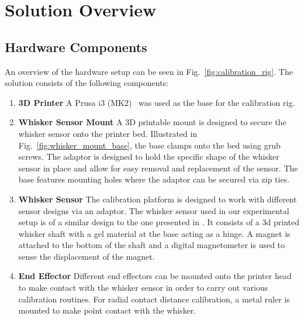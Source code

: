 \documentclass[runningheads]{llncs}
\begin{document}
\section{Solution Overview}

\subsection{Hardware Components}

An overview of the hardware setup can be seen in Fig.~\ref{fig:calibration_rig}. The solution consists of the following components:

\begin{enumerate}
    \item \textbf{3D Printer} A Prusa i3 (MK2)~\cite{OriginalPrusaI3} was used as the base for the calibration rig.

    \item \textbf{Whisker Sensor Mount} A 3D printable mount is designed to secure the whisker sensor onto the printer bed. Illustrated in Fig.~\ref{fig:whisker_mount_base}, the base clamps onto the bed using grub screws. The adaptor is designed to hold the specific shape of the whisker sensor in place and allow for easy removal and replacement of the sensor. The base features mounting holes where the adaptor can be secured via zip ties.

    \item \textbf{Whisker Sensor} The calibration platform is designed to work with different sensor designs via an adaptor. The whisker sensor used in our experimental setup is of a similar design to the one presented in \cite{Paparas_Ratatouille-Whiskers_Ratatouille-Whisker_Ratatouille_Whisker_2024}. It consists of a 3d printed whisker shaft with a gel material at the base acting as a hinge. A magnet is attached to the bottom of the shaft and a digital magnetometer is used to sense the displacement of the magnet.
    
    \item \textbf{End Effector} Different end effectors can be mounted onto the printer head to make contact with the whisker sensor in order to carry out various calibration routines. For radial contact distance calibration, a metal ruler is mounted to make point contact with the whisker.
\end{enumerate}
\end{document}
